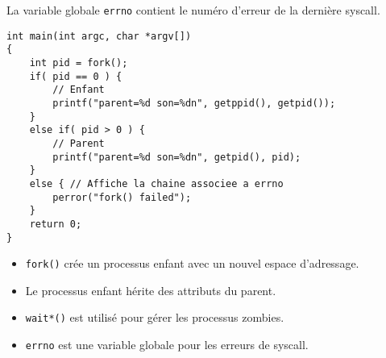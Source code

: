 \documentclass[12pt]{article}
\begin{document}
\begin{tcolorbox}[title={À retenir}]
La variable globale \texttt{errno} contient le numéro d'erreur de la dernière syscall.
\end{tcolorbox}

\begin{lstlisting}
int main(int argc, char *argv[])
{
    int pid = fork();
    if( pid == 0 ) {
        // Enfant
        printf("parent=%d son=%dn", getppid(), getpid());
    }
    else if( pid > 0 ) {
        // Parent
        printf("parent=%d son=%dn", getpid(), pid);
    }
    else { // Affiche la chaine associee a errno
        perror("fork() failed");
    }
    return 0;
}
\end{lstlisting}

\begin{tcolorbox}[title={Fiche Récapitulative}]
\begin{itemize}
    \item \texttt{fork()} crée un processus enfant avec un nouvel espace d'adressage.
    \item Le processus enfant hérite des attributs du parent.
    \item \texttt{wait*()} est utilisé pour gérer les processus zombies.
    \item \texttt{errno} est une variable globale pour les erreurs de syscall.
\end{itemize}
\end{tcolorbox}
\end{document}
